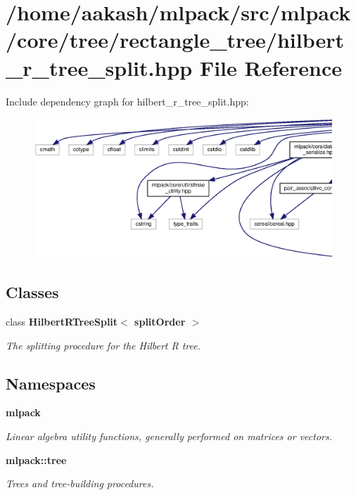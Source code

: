\section{/home/aakash/mlpack/src/mlpack/core/tree/rectangle\+\_\+tree/hilbert\+\_\+r\+\_\+tree\+\_\+split.hpp File Reference}
\label{hilbert__r__tree__split_8hpp}
Include dependency graph for hilbert\+\_\+r\+\_\+tree\+\_\+split.\+hpp\+:
\nopagebreak
\begin{figure}[H]
\begin{center}
\leavevmode
\includegraphics[width=350pt]{hilbert__r__tree__split_8hpp__incl}
\end{center}
\end{figure}
\subsection*{Classes}
\begin{DoxyCompactItemize}
\item 
class \textbf{ Hilbert\+R\+Tree\+Split$<$ split\+Order $>$}
\begin{DoxyCompactList}\small\item\em The splitting procedure for the Hilbert R tree. \end{DoxyCompactList}\end{DoxyCompactItemize}
\subsection*{Namespaces}
\begin{DoxyCompactItemize}
\item 
 \textbf{ mlpack}
\begin{DoxyCompactList}\small\item\em Linear algebra utility functions, generally performed on matrices or vectors. \end{DoxyCompactList}\item 
 \textbf{ mlpack\+::tree}
\begin{DoxyCompactList}\small\item\em Trees and tree-\/building procedures. \end{DoxyCompactList}\end{DoxyCompactItemize}


